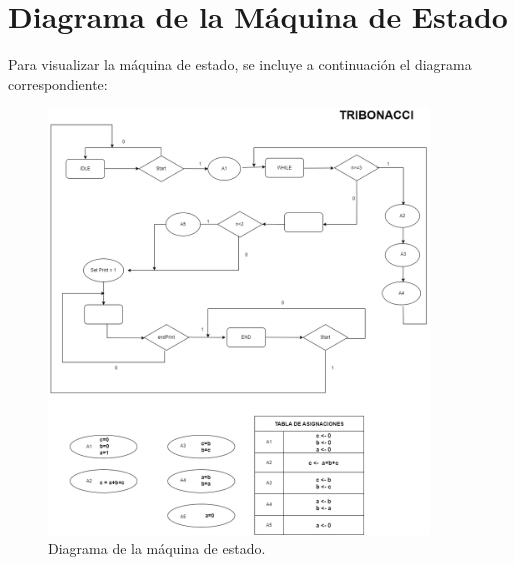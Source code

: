 \documentclass{article}
\begin{document}
	\section{Diagrama de la Máquina de Estado}
	
	Para visualizar la máquina de estado, se incluye a continuación el diagrama correspondiente:
	
	\begin{figure}[h]
		\centering
		\includegraphics[width=0.9\textwidth]{Diagrama_Tribonacci.png}
		\caption{Diagrama de la máquina de estado.}
	\end{figure}
	
\end{document}
